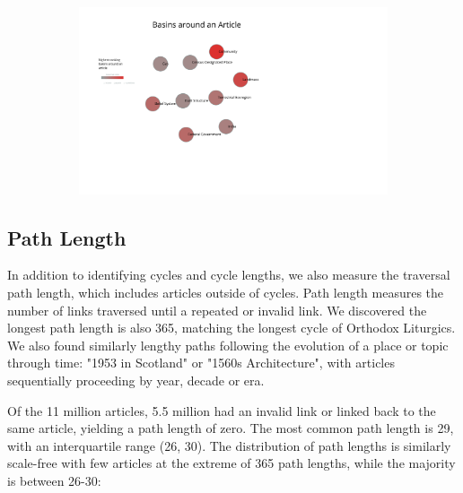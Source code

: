 \documentclass[twoside]{article}
\begin{document}
\begin{figure}[H]
\centering
\caption{highest ranking 3-Cycles}
    \begin{subfigure}[b]{0.8\textwidth}
        \includegraphics[width=\textwidth]{graphics/basins.pdf}
    \end{subfigure}
\end{figure}

\subsection{Path Length}

In addition to identifying cycles and cycle lengths, we also measure the traversal path length, which includes articles outside
of cycles. 
Path length measures the number of links traversed until a repeated or invalid link. 
We discovered the longest path length is also 365, matching the longest cycle of Orthodox Liturgics. 
We also found similarly lengthy paths following the evolution of a place or topic through time: 
"1953 in Scotland" or "1560s Architecture", with articles sequentially proceeding by year, decade or era.

Of the 11 million articles, 5.5 million had an invalid link or linked back to the same article, yielding a path length of zero. 
The most common path length is 29, with an interquartile range (26, 30).
The distribution of path lengths is similarly scale-free with few articles at the extreme of 365 path lengths, while the majority 
is between 26-30: 
\end{document}

